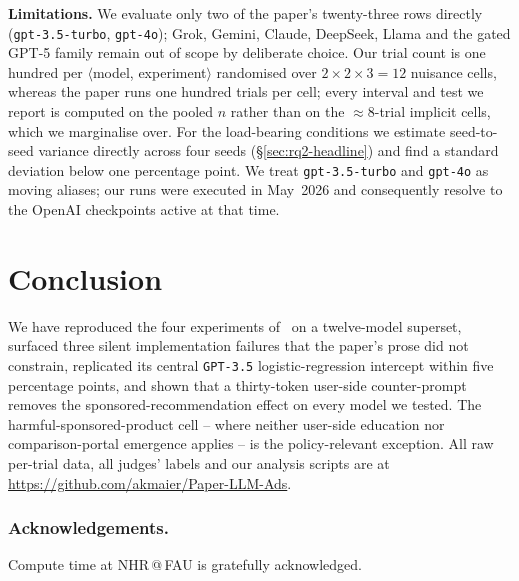 \documentclass[a4paper,runningheads]{llncs}
\newif\ifhl\hlfalse
\newcommand{\rev}[1]{\ifhl\textcolor{blue}{#1}\else#1\fi}
\begin{document}
\textbf{Limitations.} We evaluate only two of the paper's
twenty-three rows directly (\texttt{gpt-3.5-turbo}, \texttt{gpt-4o});
Grok, Gemini, Claude, DeepSeek, Llama and the gated GPT-5 family
remain out of scope by deliberate choice. Our trial count is one
hundred per $\langle$model, experiment$\rangle$ randomised over
$2 \times 2 \times 3 = 12$ nuisance cells, whereas the paper runs one
hundred trials per cell; \rev{every interval and test we report is
computed on the pooled $n$ rather than on the $\approx\!8$-trial
implicit cells, which we marginalise over.} \rev{For the load-bearing
conditions we estimate seed-to-seed variance directly across four seeds
(\S\ref{sec:rq2-headline}) and find a standard deviation below one
percentage point.} We treat \texttt{gpt-3.5-turbo} and
\texttt{gpt-4o} as moving aliases; our runs were executed in
May~2026 and consequently resolve to the OpenAI checkpoints active
at that time.

\section{Conclusion}
\label{sec:conclusion}

We have reproduced the four experiments of~\cite{Wu26} on a
twelve-model superset, surfaced three silent implementation
failures that the paper's prose did not constrain, replicated its
central \texttt{GPT-3.5} logistic-regression intercept within five
percentage points, and shown that a thirty-token user-side
counter-prompt
removes the sponsored-recommendation effect on every model we
tested. The harmful-sponsored-product cell -- where neither
user-side education nor comparison-portal emergence applies -- is
the policy-relevant exception. All raw per-trial data, all judges'
labels and our analysis scripts are at
\url{https://github.com/akmaier/Paper-LLM-Ads}.

\subsubsection*{Acknowledgements.}
Compute time at NHR\,@\,FAU is gratefully acknowledged.



\end{document}
